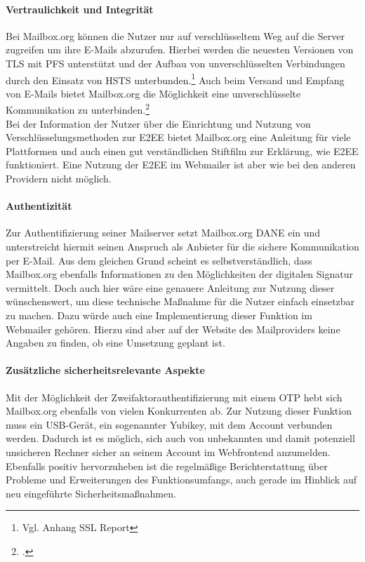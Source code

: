 \documentclass  [paper=a4,
				fontsize=12pt,
				listof=totoc,
				bibliography=totoc
				]{scrreprt}
\begin{document}
					\paragraph{Vertraulichkeit und Integrität}
						Bei Mailbox.org können die Nutzer nur auf verschlüsseltem Weg auf die Server zugreifen um ihre E-Mails abzurufen.
						Hierbei werden die neuesten Versionen von \ac{TLS} mit \ac{PFS} unterstützt und der Aufbau von unverschlüsselten Verbindungen durch den Einsatz von \ac{HSTS} unterbunden.\footnote{Vgl. Anhang SSL Report}
						Auch beim Versand und Empfang von E-Mails bietet Mailbox.org die Möglichkeit eine unverschlüsselte Kommunikation zu unterbinden.\footcite[Vgl.][]{Mailbox2014b}\medskip\\
						
						Bei der Information der Nutzer über die Einrichtung und Nutzung von Verschlüsselungsmethoden zur \ac{E2EE} bietet Mailbox.org eine Anleitung für viele Plattformen und auch einen gut verständlichen Stiftfilm zur Erklärung, wie \ac{E2EE} funktioniert.
						Eine Nutzung der \ac{E2EE} im Webmailer ist aber wie bei den anderen Providern nicht möglich.
						
					\paragraph{Authentizität}
						Zur Authentifizierung seiner Mailserver setzt Mailbox.org \ac{DANE} ein und unterstreicht hiermit seinen Anspruch als Anbieter für die sichere Kommunikation per E-Mail.
						Aus dem gleichen Grund scheint es selbstverständlich, dass Mailbox.org ebenfalls Informationen zu den Möglichkeiten der digitalen Signatur vermittelt.
						Doch auch hier wäre eine genauere Anleitung zur Nutzung dieser wünschenswert, um diese technische Maßnahme für die Nutzer einfach einsetzbar zu machen.
						Dazu würde auch eine Implementierung dieser Funktion im Webmailer gehören.
						Hierzu sind aber auf der Website des Mailproviders keine Angaben zu finden, ob eine Umsetzung geplant ist.
						
					\paragraph{Zusätzliche sicherheitsrelevante Aspekte}
						Mit der Möglichkeit der Zweifaktorauthentifizierung mit einem \ac{OTP} hebt sich Mailbox.org ebenfalls von vielen Konkurrenten ab.
						Zur Nutzung dieser Funktion muss ein USB-Gerät, ein sogenannter Yubikey, mit dem Account verbunden werden.
						Dadurch ist es möglich, sich auch von unbekannten und damit potenziell unsicheren Rechner sicher an seinem Account im Webfrontend anzumelden.
						Ebenfalls positiv hervorzuheben ist die regelmäßige Berichterstattung über Probleme und Erweiterungen des Funktionsumfangs, auch gerade im Hinblick auf neu eingeführte Sicherheitsmaßnahmen.
						
\end{document}
